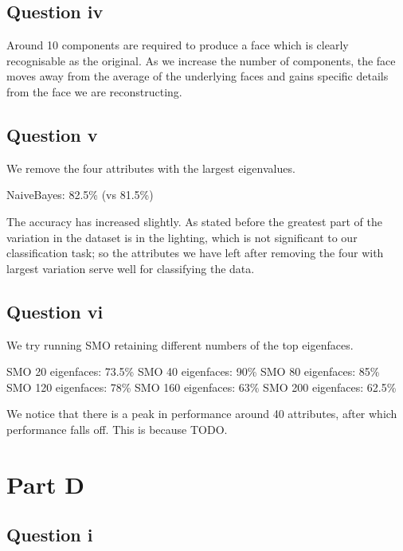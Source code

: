 \documentclass[a4paper]{article}
\begin{document}
\subsection*{Question iv}
Around 10 components are required to produce a face which is clearly recognisable as the original. As we increase the number of components, the face moves away from the average of the underlying faces and gains specific details from the face we are reconstructing.

\subsection*{Question v}
We remove the four attributes with the largest eigenvalues.

NaiveBayes: 82.5\% (vs 81.5\%)

The accuracy has increased slightly. As stated before the greatest part of the variation in the dataset is in the lighting, which is not significant to our classification task; so the attributes we have left after removing the four with largest variation serve well for classifying the data.

\subsection*{Question vi}
We try running SMO retaining different numbers of the top eigenfaces.

SMO 20 eigenfaces: 73.5\%
SMO 40 eigenfaces: 90\%
SMO 80 eigenfaces: 85\%
SMO 120 eigenfaces: 78\%
SMO 160 eigenfaces: 63\%
SMO 200 eigenfaces: 62.5\%

We notice that there is a peak in performance around 40 attributes, after which performance falls off. This is because TODO.

\section*{Part D}
\subsection*{Question i}
\end{document}
